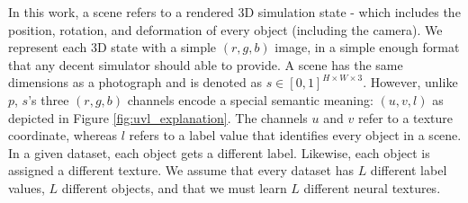 \documentclass{article}
\begin{document}
	In this work, a scene refers to a rendered 3D simulation state - which includes the position, rotation, and deformation of every object (including the camera).
	We represent each 3D state with a simple $(r,g,b)$ image, in a simple enough format that any decent simulator should able to provide.
	A scene has the same dimensions as a photograph and is denoted as 
	$s \in [0,1]^{H \times W \times 3}$.
	However, unlike $p$, $s$'s three $(r,g,b)$ channels encode a special semantic meaning: $(u,v,l)$ as depicted in Figure \ref{fig:uvl_explanation}.
	The channels $u$ and $v$ refer to a texture coordinate, whereas $l$ refers to a label value that identifies every object in a scene.
	In a given dataset, each object gets a different label. Likewise, each object is assigned a different texture.
	We assume that every dataset has $L$ different label values, $L$ different objects, and that we must learn $L$ different neural textures.






\end{document}
